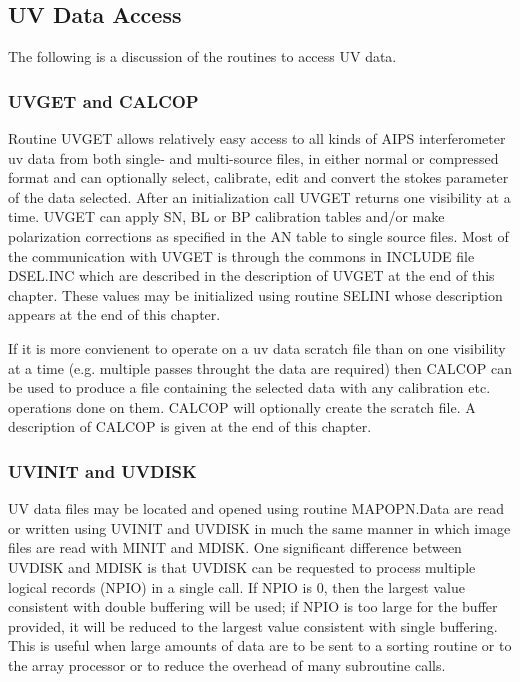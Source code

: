 \subsection {UV Data Access}
   The following is a discussion of the routines to access UV data.
\subsubsection{UVGET and CALCOP}

Routine UVGET allows relatively easy access to all kinds of AIPS
interferometer uv data from both single- and multi-source files, in
either normal or compressed format and can optionally select,
calibrate, edit and convert the stokes parameter of the data selected.
After an initialization call UVGET returns one visibility at a time.
UVGET can apply SN, BL or BP calibration tables and/or make
polarization corrections as specified in the AN table to single source
files.  Most of the communication with UVGET is through the commons in
INCLUDE file DSEL.INC which are described in the description of UVGET
at the end of this chapter.  These values may be initialized using
routine SELINI whose description appears at the end of this chapter.

If it is more convienent to operate on a uv data scratch
file than on one visibility at a time (e.g. multiple passes throught
the data are required) then CALCOP can be used to produce a file
containing the selected data with any calibration etc. operations done
on them.  CALCOP will optionally create the scratch file.  A
description of CALCOP is given at the end of this chapter.


\subsubsection{UVINIT and UVDISK}
UV data files may be located and opened using routine MAPOPN.Data are
read or written using UVINIT and UVDISK in much the same manner in
which image files are read with MINIT and MDISK. One significant
difference between UVDISK and MDISK is that UVDISK can be requested to
process multiple logical records (NPIO) in a single call. If NPIO is
0, then the largest value consistent with double buffering will be
used; if NPIO is too large for the buffer provided, it will be reduced
to the largest value consistent with single buffering. This is useful
when large amounts of data are to be sent to a sorting routine or to
the array processor or to reduce the overhead of many subroutine
calls.

